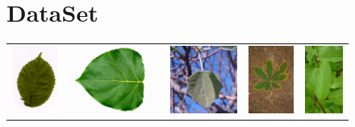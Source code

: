 \documentclass[journal, 10pt]{IEEEtran}
\begin{document}
\section{DataSet}
\label{DataSet}
  \begin{tabular}{c@{}c@{}c@{}c@{}c@{}}
  {\includegraphics[height=6.0em]{swedish1}} &
  {\includegraphics[height=6.0em]{flavia1}} &
  {\includegraphics[height=6.0em]{clef1}} &
  {\includegraphics[height=6.0em]{clef2}} &
  {\includegraphics[height=6.0em]{clef3}}
  \end{tabular}
\end{document}
